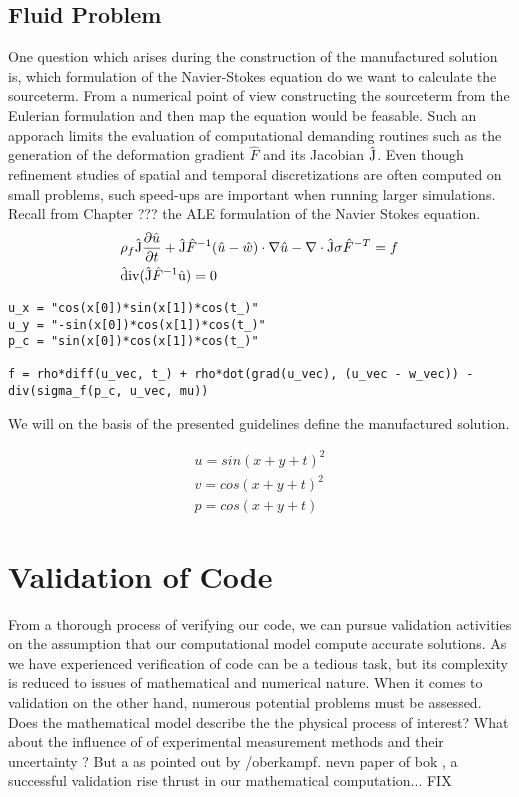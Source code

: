 \subsection{Fluid Problem}
One question which arises during the construction of the manufactured solution is, which formulation of the Navier-Stokes equation do we want to calculate the sourceterm. From a numerical point of view constructing the sourceterm from the Eulerian formulation and then map the equation would be feasable. Such an apporach limits the evaluation of computational demanding routines such as the generation of the deformation gradient $\hat{F}$ and its Jacobian $\text{\^{J}}$. Even though refinement studies of spatial and temporal discretizations are often computed on small problems, such speed-ups are important when running larger simulations. 
Recall from Chapter ??? the ALE formulation of the Navier Stokes equation. 
\begin{align*}
&\rho_f \text{\^{J}}\frac{\partial \hat{u}}{\partial t} + \text{\^{J}} \hat{F}^{-1} (\hat{u} - \hat{w})\cdot \nabla \hat{u} 
- \nabla \cdot \text{\^{J}} \sigma \hat{F}^{-T} = f \\
&\text{\^{div}}(\text{\^{J}}\hat{F}^{-1}\text{\^{u}}) = 0
\end{align*}


\begin{lstlisting}[style=python, caption={Descriptive Caption Text}, label=DescriptiveLabel, frame=single]
u_x = "cos(x[0])*sin(x[1])*cos(t_)"
u_y = "-sin(x[0])*cos(x[1])*cos(t_)"
p_c = "sin(x[0])*cos(x[1])*cos(t_)"

f = rho*diff(u_vec, t_) + rho*dot(grad(u_vec), (u_vec - w_vec)) -
div(sigma_f(p_c, u_vec, mu))
\end{lstlisting}

We will on the basis of the presented guidelines define the manufactured solution.

\begin{align*}
u = sin(x + y + t)^2 \\
v = cos(x + y +  t)^2 \\
p = cos(x + y + t)
\end{align*}

\newpage                                                                                                                                             
\section{Validation of Code}
From a thorough process of verifying our code, we can pursue validation activities on the assumption that our computational model compute accurate solutions. As we have experienced verification of code can be a tedious task, but its complexity is reduced to issues of mathematical and numerical nature. When it comes to validation on the other hand, numerous potential problems must be assessed.  Does the mathematical model describe the the physical process of interest? What about the influence of of experimental measurement methods and their uncertainty ? But a as pointed out by /oberkampf. nevn paper of bok , a  successful validation rise thrust in our mathematical computation... FIX

